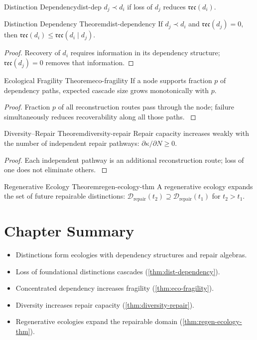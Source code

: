 \documentclass[12pt,twoside,openright]{book}
\newcommand{\reco}{\mathfrak{rec}}
\newenvironment{chapsummary}{%
  \begin{tcolorbox}[colback=DistBlue!5,colframe=DistBlue,
    title={\faBookOpen\enspace Summary},
    fonttitle=\sffamily\bfseries\color{white},
    attach boxed title to top left={yshift=-2mm,xshift=4mm},
    boxed title style={colback=DistBlue,rounded corners}]
  \begin{itemize}[nosep,leftmargin=*]}{%
  \end{itemize}\end{tcolorbox}}
\begin{document}
\begin{definition}{Distinction Dependency}{dist-dep}
  $d_j\prec d_i$ if loss of $d_j$ reduces $\reco(d_i)$.
\end{definition}

\begin{theorem}{Distinction Dependency Theorem}{dist-dependency}
  If $d_j\prec d_i$ and $\reco(d_j)=0$, then
  $\reco(d_i)\le\reco(d_i\mid d_j)$.
\end{theorem}
\begin{proof}
  Recovery of $d_i$ requires information in its dependency
  structure; $\reco(d_j)=0$ removes that information.
\end{proof}

\begin{theorem}{Ecological Fragility Theorem}{eco-fragility}
  If a node supports fraction $p$ of dependency paths,
  expected cascade size grows monotonically with $p$.
\end{theorem}
\begin{proof}
  Fraction $p$ of all reconstruction routes pass through
  the node; failure simultaneously reduces recoverability
  along all those paths. \parencite{may1973,levin1998}
\end{proof}

\begin{theorem}{Diversity--Repair Theorem}{diversity-repair}
  Repair capacity increases weakly with the number of
  independent repair pathways:
  $\partial\kappa/\partial N\ge0$.
\end{theorem}
\begin{proof}
  Each independent pathway is an additional reconstruction
  route; loss of one does not eliminate others.
  \parencite{tilman1996}
\end{proof}

\begin{theorem}{Regenerative Ecology Theorem}{regen-ecology-thm}
  A regenerative ecology expands the set of future
  repairable distinctions:
  $\mathcal{D}_\mathrm{repair}(t_2)
  \supseteq\mathcal{D}_\mathrm{repair}(t_1)$
  for $t_2>t_1$.
\end{theorem}

\section*{Chapter Summary}
\begin{chapsummary}
  \item Distinctions form ecologies with dependency
        structures and repair algebras.
  \item Loss of foundational distinctions cascades
        (\cref{thm:dist-dependency}).
  \item Concentrated dependency increases fragility
        (\cref{thm:eco-fragility}).
  \item Diversity increases repair capacity
        (\cref{thm:diversity-repair}).
  \item Regenerative ecologies expand the repairable domain
        (\cref{thm:regen-ecology-thm}).
\end{chapsummary}
\end{document}
